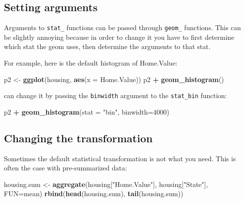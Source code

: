 \documentclass[]{book}
\newenvironment{Shaded}{\begin{snugshade}}{\end{snugshade}}
\newcommand{\KeywordTok}[1]{\textcolor[rgb]{0.13,0.29,0.53}{\textbf{#1}}}
\newcommand{\DataTypeTok}[1]{\textcolor[rgb]{0.13,0.29,0.53}{#1}}
\newcommand{\DecValTok}[1]{\textcolor[rgb]{0.00,0.00,0.81}{#1}}
\newcommand{\StringTok}[1]{\textcolor[rgb]{0.31,0.60,0.02}{#1}}
\newcommand{\OperatorTok}[1]{\textcolor[rgb]{0.81,0.36,0.00}{\textbf{#1}}}
\newcommand{\NormalTok}[1]{#1}
\begin{document}
\subsection{Setting arguments}\label{setting-arguments}

Arguments to \texttt{stat\_} functions can be passed through
\texttt{geom\_} functions. This can be slightly annoying because in
order to change it you have to first determine which stat the geom uses,
then determine the arguments to that stat.

For example, here is the default histogram of Home.Value:

\begin{Shaded}
\begin{Highlighting}[]
\NormalTok{p2 <-}\StringTok{ }\KeywordTok{ggplot}\NormalTok{(housing, }\KeywordTok{aes}\NormalTok{(}\DataTypeTok{x =}\NormalTok{ Home.Value))}
\NormalTok{p2 }\OperatorTok{+}\StringTok{ }\KeywordTok{geom_histogram}\NormalTok{()}
\end{Highlighting}
\end{Shaded}

can change it by passing the \texttt{binwidth} argument to the
\texttt{stat\_bin} function:

\begin{Shaded}
\begin{Highlighting}[]
\NormalTok{p2 }\OperatorTok{+}\StringTok{ }\KeywordTok{geom_histogram}\NormalTok{(}\DataTypeTok{stat =} \StringTok{"bin"}\NormalTok{, }\DataTypeTok{binwidth=}\DecValTok{4000}\NormalTok{)}
\end{Highlighting}
\end{Shaded}

\subsection{Changing the
transformation}\label{changing-the-transformation}

Sometimes the default statistical transformation is not what you need.
This is often the case with pre-summarized data:

\begin{Shaded}
\begin{Highlighting}[]
\NormalTok{housing.sum <-}\StringTok{ }\KeywordTok{aggregate}\NormalTok{(housing[}\StringTok{"Home.Value"}\NormalTok{], housing[}\StringTok{"State"}\NormalTok{], }\DataTypeTok{FUN=}\NormalTok{mean)}
\KeywordTok{rbind}\NormalTok{(}\KeywordTok{head}\NormalTok{(housing.sum), }\KeywordTok{tail}\NormalTok{(housing.sum))}
\end{Highlighting}
\end{Shaded}
\end{document}
